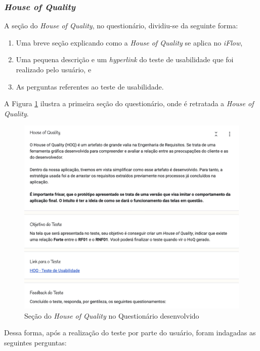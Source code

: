 \subsubsection{\textit{House of Quality}}
A seção do \textit{House of Quality}, no questionário, dividiu-se da seguinte forma:

\begin{enumerate}
    \item Uma breve seção explicando como a \textit{House of Quality} se aplica no \textit{iFlow},
    \item Uma pequena descrição e um \textit{hyperlink} do teste de usabilidade que foi realizado pelo usuário, e
    \item As perguntas referentes ao teste de usabilidade.
\end{enumerate}

A Figura \ref{fig:hq_secao} ilustra a primeira seção do questionário, onde é retratada a \textit{House of Quality}.

\begin{figure}[H]
    \begin{center}
        \caption{{Seção do \textit{House of Quality} no Questionário desenvolvido}}
        \label{fig:hq_secao}
        \includegraphics[scale=0.5]{figuras/questionario/house-of-quality-section-1.png}
    \end{center}
\end{figure}

Dessa forma, após a realização do teste por parte do usuário, foram indagadas as seguintes perguntas:

